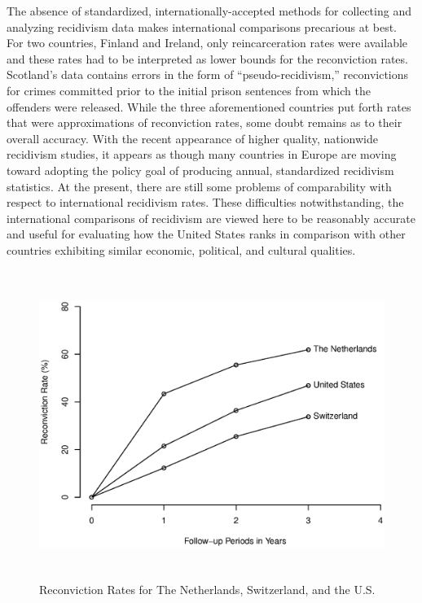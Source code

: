 The absence of standardized, internationally-accepted methods for collecting and analyzing recidivism data makes international comparisons precarious at best.  For two countries, Finland and Ireland, only reincarceration rates were available and these rates had to be interpreted as lower bounds for the reconviction rates.  Scotland's data contains errors in the form of ``pseudo-recidivism,'' reconvictions for crimes committed prior to the initial prison sentences from which the offenders were released.  While the three aforementioned countries put forth rates that were approximations of reconviction rates, some doubt remains as to their overall accuracy.  With the recent appearance of higher quality, nationwide recidivism studies, it appears as though many countries in Europe are moving toward adopting the policy goal of producing annual, standardized recidivism statistics.  At the present, there are still some problems of comparability with respect to international recidivism rates.  These difficulties notwithstanding, the international comparisons of recidivism are viewed here to be reasonably accurate and useful for evaluating how the United States ranks in comparison with other countries exhibiting similar economic, political, and cultural qualities.

\begin{figure}[b]
\begin{center}
\includegraphics[width=5.9in, height=3.95in, keepaspectratio=true]{graph302b.eps}
\caption{Reconviction Rates for The Netherlands, Switzerland, and the U.S.}
\end{center}
\end{figure}

